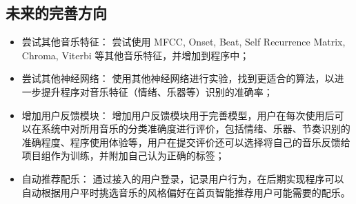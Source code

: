 \documentclass[a4paper,utf8,10pt]{article}
\begin{document}
\subsection{未来的完善方向}
\noindent\begin{itemize}
\item 尝试其他音乐特征：
尝试使用 MFCC, Onset, Beat, Self Recurrence Matrix, Chroma, Viterbi 等其他音乐特征，并增加到程序中；
\item 尝试其他神经网络：
使用其他神经网络进行实验，找到更适合的算法，以进一步提升程序对音乐特征（情绪、乐器等）识别的准确率；
\item 增加用户反馈模块：
增加用户反馈模块用于完善模型，用户在每次使用后可以在系统中对所用音乐的分类准确度进行评价，包括情绪、乐器、节奏识别的准确程度、程序使用体验等，用户在提交评价还可以选择将自己的音乐反馈给项目组作为训练，并附加自己认为正确的标签；
\item 自动推荐配乐：
通过接入的用户登录，记录用户行为，在后期实现程序可以自动根据用户平时挑选音乐的风格偏好在首页智能推荐用户可能需要的配乐。
\end{itemize}

{}

\end{document}
